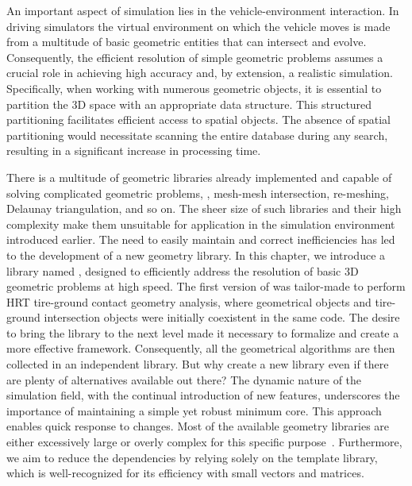 An important aspect of simulation lies in the vehicle-environment interaction. In driving simulators the virtual environment on which the vehicle moves is made from a multitude of basic geometric entities that can intersect and evolve. Consequently, the efficient resolution of simple geometric problems assumes a crucial role in achieving high accuracy and, by extension, a realistic simulation. Specifically, when working with numerous geometric objects, it is essential to partition the 3D space with an appropriate data structure. This structured partitioning facilitates efficient access to spatial objects. The absence of spatial partitioning would necessitate scanning the entire database during any search, resulting in a significant increase in processing time.

There is a multitude of geometric libraries already implemented and capable of solving complicated geometric problems, \eg{}, mesh-mesh intersection, re-meshing, Delaunay triangulation, and so on. The sheer size of such libraries and their high complexity make them unsuitable for application in the simulation environment introduced earlier. The need to easily maintain and correct inefficiencies has led to the development of a new geometry library. In this chapter, we introduce a \cpp{} library named \Acme{}, designed to efficiently address the resolution of basic 3D geometric problems at high speed. The first version of \Acme{} was tailor-made to perform \ac{HRT} tire-ground contact geometry analysis, where geometrical objects and tire-ground intersection objects were initially coexistent in the same code. The desire to bring the library to the next level made it necessary to formalize and create a more effective framework. Consequently, all the geometrical algorithms are then collected in an independent library. But why create a new library even if there are plenty of alternatives available out there? The dynamic nature of the simulation field, with the continual introduction of new features, underscores the importance of maintaining a simple yet robust minimum core. This approach enables quick response to changes. Most of the available geometry libraries are either excessively large or overly complex for this specific purpose~\cite{cgal2023cgal, libigl2018libigl}. Furthermore, we aim to reduce the dependencies by relying solely on the \cpp{} \Eigen{} template library, which is well-recognized for its efficiency with small vectors and matrices.


